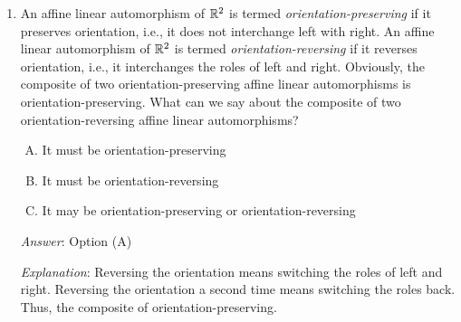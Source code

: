 \documentclass[10pt]{amsart}
\begin{document}
\begin{enumerate}
  {\em Answer}: Option (B)

  {\em Explanation}: If something preserves lengths, it sends
  triangles to congruent triangles, hence it also preserves areas.

  There can be area-preserving affine linear automorphisms that are
  not self-isometries. Shear operations, such as the one with this
  matrix:

  $$\left[\begin{matrix} 1 & 1 \\ 0 & 1 \\\end{matrix}\right]$$

  are examples. The point is that areas still get preserved. For
  instance, a triangle based on the $x$-axis gets bent out of shape,
  but its base and height remain the same, hence its area remains the
  same.

  {\em Performance review}: 12 out of 27 got this. 9 chose (A), 4
  chose (C), 1 chose (D), 1 left the question blank.

  {\em Historical note (last time)}: $15$ out of $27$ got this. $5$ chose (A),
  $3$ each chose (C) and (D), $1$ left the question blank.

\item An affine linear automorphism of $\mathbb{R}^2$ is termed {\em
  orientation-preserving} if it preserves orientation, i.e., it does
  not interchange left with right. An affine linear automorphism of
  $\mathbb{R}^2$ is termed {\em orientation-reversing} if it reverses
  orientation, i.e., it interchanges the roles of left and
  right. Obviously, the composite of two orientation-preserving affine
  linear automorphisms is orientation-preserving. What can we say
  about the composite of two orientation-reversing affine linear
  automorphisms?

  \begin{enumerate}[(A)]
  \item It must be orientation-preserving
  \item It must be orientation-reversing
  \item It may be orientation-preserving or orientation-reversing
  \end{enumerate}

  {\em Answer}: Option (A)

  {\em Explanation}: Reversing the orientation means switching the
  roles of left and right. Reversing the orientation a second time
  means switching the roles back. Thus, the composite of
  orientation-preserving.


\end{enumerate}
\end{document}
